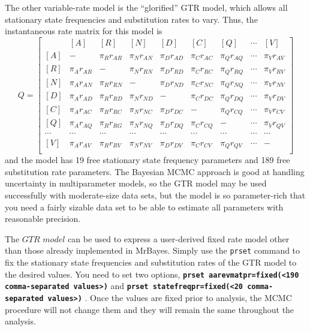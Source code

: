 \documentclass[12pt]{book}
\newcommand{\ttt}[1]{\texttt{#1} }
\newcommand{\tb}[1]{\ttt{\textbf{#1}} }
\begin{document}
The other variable-rate model is the ``glorified'' GTR model, which allows all stationary state
frequencies and substitution rates to vary. Thus, the instantaneous rate matrix for this model is
\[
Q=\begin{bmatrix}
    & [A] & [R] & [N] & [D] & [C] & [Q] & \cdots & [V]\\ 
 [A]& - & \pi_{R} r_{AR}& \pi_{N} r_{AN} & \pi_{D} r_{AD}& \pi_{C} r_{AC}& \pi_{Q} r_{AQ} & \cdots & \pi_V 
r_{AV}\\ 
 [R]& \pi_{A} r_{AR} &- &  \pi_{N}  r_{RN}& \pi_{D} r_{RD}& \pi_{C} r_{RC}& \pi_{Q} r_{RQ} & \cdots & \pi_V 
r_{RV}\\ 
 [N]& \pi_{A} r_{AN}&\pi_{R} r_{RN}&- &   \pi_{D} r_{ND}& \pi_{C} r_{NC}& \pi_{Q} r_{NQ} & \cdots & \pi_V 
r_{NV}\\ 
 [D]& \pi_{A} r_{AD} &\pi_{R} r_{RD} &  \pi_{N} r_{ND}&- &  \pi_{C} r_{DC}& \pi_{Q} r_{DQ} & \cdots & \pi_V 
r_{DV}\\ 
 [C]& \pi_{A} r_{AC} &\pi_{R} r_{RC} &  \pi_{N} r_{NC}&  \pi_{D} r_{DC}&- & \pi_{Q} r_{CQ} & \cdots & \pi_V 
r_{CV}\\ 
 [Q]& \pi_{A} r_{AQ} &\pi_{R} r_{RG} &  \pi_{N} r_{NQ}&  \pi_{D} r_{DQ}& \pi_{C} r_{CQ} &- & \cdots & \pi_V 
r_{QV}\\  
 \cdots& \cdots& \cdots& \cdots& \cdots& \cdots& \cdots& \cdots& \cdots\\
 [V]& \pi_{A} r_{AV} &\pi_{R} r_{RV} &  \pi_{N} r_{NV}&  \pi_{D} r_{DV}& \pi_{C} r_{CV} &\pi_Q r_{QV}& 
\cdots &- \\ 
\end{bmatrix}
\]
and the model has 19 free stationary state frequency parameters and 189 free substitution rate
parameters. The Bayesian MCMC approach is good at handling uncertainty in multiparameter models, so
the GTR model may be used successfully with moderate-size data sets, but the model is so
parameter-rich that you need a fairly sizable data set to be able to estimate all parameters with
reasonable precision.

The $GTR$ $model$ can be used to express a user-derived fixed rate model other than those already
implemented in MrBayes. Simply use the \ttt{prset} command to fix the stationary state frequencies
and substitution rates of the GTR model to the desired values. You need to set two options,
\tb{prset aarevmatpr=fixed(<190 comma-separated values>)} and \tb{prset statefreqpr=fixed(<20
comma-separated values>)}. Once the values are fixed prior to analysis, the MCMC procedure will not
change them and they will remain the same throughout the analysis.
\end{document}
